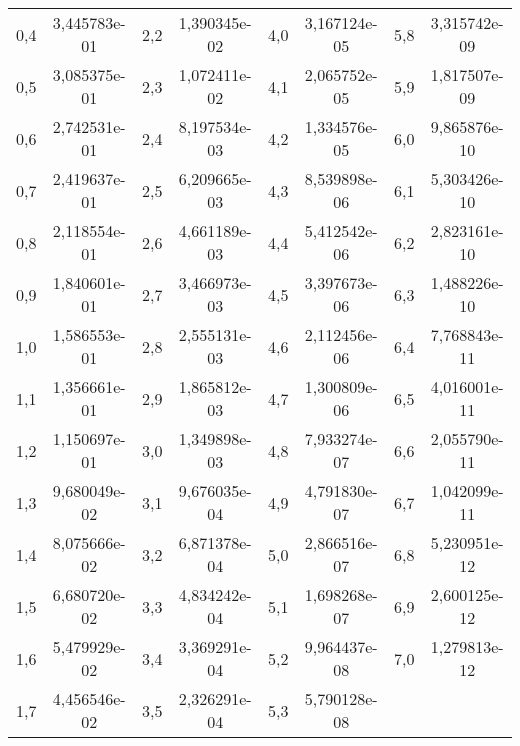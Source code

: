 \documentclass[12pt,es,blanco]{uah}
\begin{document}
\begin{center}
\begin{tabular}{cc|cc|cc|cc}
        0,4 & 3,445783e-01 & 2,2 & 1,390345e-02 & 4,0 & 3,167124e-05 & 5,8 & 3,315742e-09 \\
        0,5 & 3,085375e-01 & 2,3 & 1,072411e-02 & 4,1 & 2,065752e-05 & 5,9 & 1,817507e-09 \\
        0,6 & 2,742531e-01 & 2,4 & 8,197534e-03 & 4,2 & 1,334576e-05 & 6,0 & 9,865876e-10 \\
        0,7 & 2,419637e-01 & 2,5 & 6,209665e-03 & 4,3 & 8,539898e-06 & 6,1 & 5,303426e-10 \\
        0,8 & 2,118554e-01 & 2,6 & 4,661189e-03 & 4,4 & 5,412542e-06 & 6,2 & 2,823161e-10 \\
        0,9 & 1,840601e-01 & 2,7 & 3,466973e-03 & 4,5 & 3,397673e-06 & 6,3 & 1,488226e-10 \\
        1,0 & 1,586553e-01 & 2,8 & 2,555131e-03 & 4,6 & 2,112456e-06 & 6,4 & 7,768843e-11 \\
        1,1 & 1,356661e-01 & 2,9 & 1,865812e-03 & 4,7 & 1,300809e-06 & 6,5 & 4,016001e-11 \\
        1,2 & 1,150697e-01 & 3,0 & 1,349898e-03 & 4,8 & 7,933274e-07 & 6,6 & 2,055790e-11 \\
        1,3 & 9,680049e-02 & 3,1 & 9,676035e-04 & 4,9 & 4,791830e-07 & 6,7 & 1,042099e-11 \\
        1,4 & 8,075666e-02 & 3,2 & 6,871378e-04 & 5,0 & 2,866516e-07 & 6,8 & 5,230951e-12 \\
        1,5 & 6,680720e-02 & 3,3 & 4,834242e-04 & 5,1 & 1,698268e-07 & 6,9 & 2,600125e-12 \\
        1,6 & 5,479929e-02 & 3,4 & 3,369291e-04 & 5,2 & 9,964437e-08 & 7,0 & 1,279813e-12 \\
        1,7 & 4,456546e-02 & 3,5 & 2,326291e-04 & 5,3 & 5,790128e-08 & \\                 
    \end{tabular}
    \renewcommand{\arraystretch}{1}
    \vspace{0.5cm}

\end{center}
\end{document}
